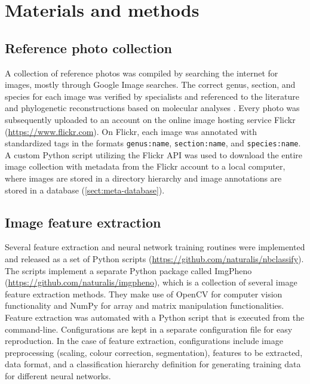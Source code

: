 \documentclass[3p,twocolumn,10pt]{elsarticle}
\begin{document}
\lipsum[1]

\section{Materials and methods}
\label{sect:methods}

\subsection{Reference photo collection}

A collection of reference photos was compiled by searching the internet for images, mostly through Google Image searches. The correct genus, section, and species for each image was verified by specialists and referenced to the literature \citet{Cribb1998, Pridgeon1999, Frosch2012} and phylogenetic reconstructions based on molecular analyses \citep{Li2011, Chochai2012}. Every photo was subsequently uploaded to an account on the online image hosting service Flickr (\url{https://www.flickr.com}). On Flickr, each image was annotated with standardized tags in the formats \texttt{genus:name}, \texttt{section:name}, and \texttt{species:name}. A custom Python script utilizing the Flickr API was used to download the entire image collection with metadata from the Flickr account to a local computer, where images are stored in a directory hierarchy and image annotations are stored in a database (\ref{sect:meta-database}).

\subsection{Image feature extraction}

Several feature extraction and neural network training routines were implemented and released as a set of Python scripts (\url{https://github.com/naturalis/nbclassify}). The scripts implement a separate Python package called ImgPheno (\url{https://github.com/naturalis/imgpheno}), which is a collection of several image feature extraction methods. They make use of OpenCV \citep{Pulli2012} for computer vision functionality and NumPy \citep{VanderWalt2011} for array and matrix manipulation functionalities. Feature extraction was automated with a Python script that is executed from the command-line. Configurations are kept in a separate configuration file for easy reproduction. In the case of feature extraction, configurations include image preprocessing (scaling, colour correction, segmentation), features to be extracted, data format, and a classification hierarchy definition for generating training data for different neural networks.
\end{document}
